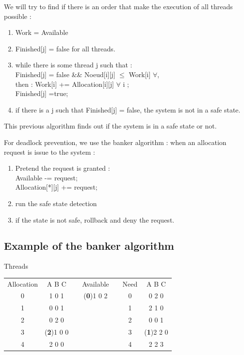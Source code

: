 \documentclass[a4paper,10pt]{article}
\begin{document}
We will try to find if there is an order that make the execution of all threads possible :

\begin{enumerate}
  \item Work = Available
  \item Finished[j] = false for all threads.
  \item while there is some thread j such that : \\ Finished[j] = false \&\& Noeud[i][j] $\leq$ Work[i] $\forall$, \\then : Work[i] += Allocation[i][j] $\forall$ i ; \\Finished[j] =true;
  \item if there is a j such that Finished[j] = false, the system is not in a safe state.
\end{enumerate}

This previous algorithm finds out if the system is in a safe state or not.

For deadlock prevention, we use the banker algorithm : when an allocation request is issue to the system :

\begin{enumerate}

  \item Pretend the request is granted : \\ Available -= request; \\ Allocation[*][j] += request;
  \item run the safe state detection
  \item if the state is not safe, rollback and deny the request.
  
\end{enumerate}

\subsection{Example of the banker algorithm}


  \begin{center}
  Threads
    \begin{tabular}{ccccccc}
       Allocation& A B C & &Available & & Need & A B C\\
       0 & 1 0 1 & & (\textbf{0})1 0 2 & & 0 & 0 2 0 \\
       1 & 0 0 1 & &  & & 1 & 2 1 0\\
       2 & 0 2 0 & &  & & 2 & 0 0 1\\
       3 & (\textbf{2})1 0 0 & &  & & 3 & (\textbf{1})2 2 0\\
       4 & 2 0 0 & &  & & 4 & 2 2 3\\
    \end{tabular}
  \end{center}
\end{document}

